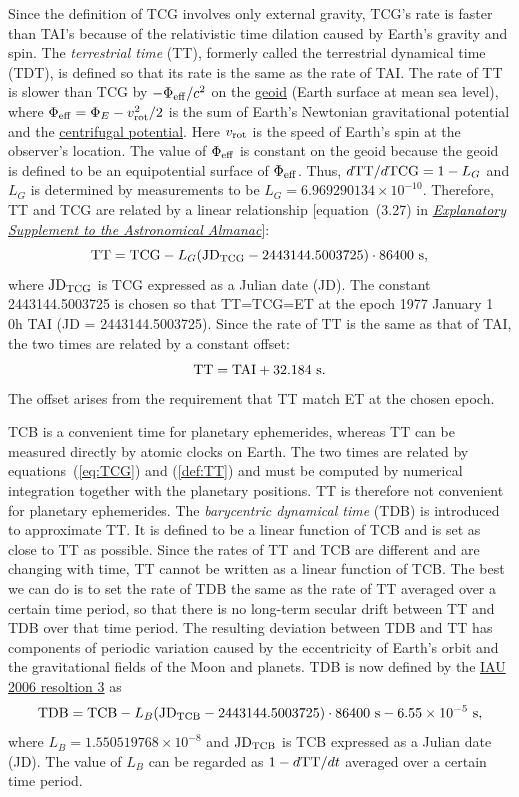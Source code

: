 \documentclass[12pt]{article}
\newcommand \beq {\begin{equation}}
\newcommand \eeq {\end{equation}}
\newcommand{\expl}{\href{http://www.uscibooks.com/urban.htm}{\it Explanatory Supplement to the Astronomical Almanac}}
\begin{document}
Since the definition of TCG involves only external gravity, TCG's rate is {\rm faster} 
than TAI's because of the relativistic time dilation caused by 
Earth's gravity and spin. 
The {\em terrestrial time} (TT), 
formerly called the {\rm terrestrial dynamical time} (TDT), is defined so that its rate 
is the same as the rate of TAI. 
The rate of TT is slower than TCG by $-\Phi_{\rm eff}/c^2$ on the 
\href{https://en.wikipedia.org/wiki/Geoid}{geoid} (Earth surface at mean sea level), 
where $\Phi_{\rm eff}=\Phi_E - v^2_{\rm rot}/2$ is the sum of Earth's Newtonian 
gravitational potential and the 
\href{http://scienceworld.wolfram.com/physics/CentrifugalPotential.html}{centrifugal 
potential}. Here $v_{\rm rot}$ is the speed of Earth's spin at the observer's location. 
The value of $\Phi_{\rm eff}$ 
is constant on the geoid because the geoid is defined to be an equipotential 
surface of $\Phi_{\rm eff}$. Thus, 
$d {\rm TT}/d {\rm TCG} = 1-L_G$ and $L_G$ is determined by measurements to be 
$L_G=6.969290134\times 10^{-10}$. Therefore, TT and TCG are related by a linear 
relationship [equation~(3.27) in \expl ]: 
\beq
  {\rm TT} = {\rm TCG} - L_G ({\rm JD}_{\rm TCG} - 2443144.5003725) \cdot 86400~{\rm s} ,
\label{def:TT}
\eeq
where ${\rm JD_{TCG}}$ is TCG expressed as a Julian date (JD). The 
constant 2443144.5003725 is chosen so that TT=TCG=ET at the epoch 1977 January 1 0h TAI 
(JD = 2443144.5003725). Since the rate of TT is the same as that of TAI, the two 
times are related by a constant offset:
\beq
  {\rm TT} = {\rm TAI} + 32.184~{\rm s} .
\eeq
The offset arises from the requirement that TT match ET at the chosen epoch.

TCB is a convenient time for planetary ephemerides, whereas TT can be measured 
directly by atomic clocks on Earth. The two times are related by equations~(\ref{eq:TCG}) 
and (\ref{def:TT}) and must be computed by numerical integration together with the 
planetary positions. TT is therefore not convenient for planetary ephemerides. 
The {\em barycentric dynamical time} (TDB) is introduced to approximate TT. It is 
defined to be a linear function of TCB and is set as close to TT as possible. Since 
the rates of TT and TCB are different and are changing with time, TT cannot be 
written as a linear function of TCB. The best we can do is to set the rate of 
TDB the same as the rate of TT averaged over a certain time period, so that there 
is no long-term secular drift between TT and TDB over that time period. 
The resulting deviation between TDB and TT 
has components of periodic variation caused by the eccentricity of Earth's orbit and 
the gravitational fields of the Moon and planets. TDB is now defined by the 
\href{https://www.iau.org/static/resolutions/IAU2006_Resol3.pdf}{IAU 2006 resoltion 3} 
as
\beq
  {\rm TDB} = {\rm TCB} - L_B ({\rm JD_{TCB}} - 2443144.5003725)\cdot 86400~{\rm s} 
- 6.55\times 10^{-5}~{\rm s} ,
\eeq
where $L_B= 1.550519768\times 10^{-8}$ 
and ${\rm JD_{TCB}}$ is TCB expressed as a Julian date (JD). The value of $L_B$ 
can be regarded as $1-d {\rm TT}/dt$ averaged over a certain time period.
\end{document}
